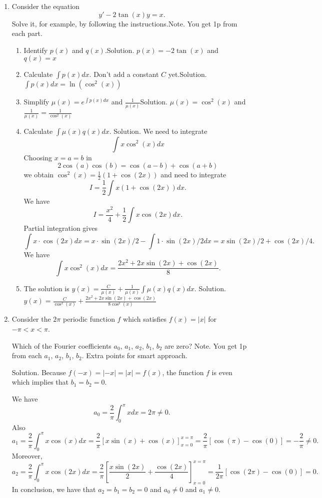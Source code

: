 \documentclass[12pt]{article}
\newcommand{\sqbrac}[1]{\left[#1\right]}
\newcommand{\ratkaisu}[1]{{\color{blue}\quad\textrm{Solution. } #1}}
\newcommand{\huomautus}[1]{{\color{magenta}\quad\textrm{Note. } #1}}
\begin{document}
\begin{enumerate}
\begin{enumerate}
\huomautus{The problem is graded as whole. Depending on the explanation / Points are given with the idea $1.6+1.6+1.6$ and then rounded up.}

\end{enumerate}

\item Consider the equation
$$
y'-2\tan(x)y=x.
$$
Solve it, for example, by following the instructions.\huomautus{You get 1p from each part.}
\begin{enumerate}
\item Identify $p(x)$ and $q(x)$.\ratkaisu{$p(x)=-2\tan(x)$ and $q(x)=x$}
\item Calculate $\int p(x)dx$. Don't add a constant $C$ yet.\ratkaisu{$\int p(x)dx=\ln(\cos^2(x))$}
\item Simplify $\mu(x)=e^{\int p(x)dx}$ and $\frac{1}{\mu(x)}$\ratkaisu{$\mu(x)=\cos^2(x)$ and $\frac{1}{\mu(x)}=\frac{1}{\cos^2(x)}$}
\item Calculate $\int \mu(x)q(x)dx$.
\ratkaisu{We need to integrate
$$
\int x\cos^2(x)dx
$$
Choosing $x=a=b$ in
$$
2\cos(a)\cos(b)=\cos(a-b)+\cos(a+b)
$$
we obtain $\cos^2(x)=\frac12(1+\cos(2x))$ and need to integrate
$$
I=\frac12\int x(1+\cos(2x))dx.
$$
We have
$$
I=\frac{x^2}{4}+\frac12\int x\cos(2x)dx.
$$
Partial integration gives
$$
\int x\cdot \cos(2x)dx
=x\cdot \sin(2x)/2-\int 1\cdot \sin(2x)/2 dx
=x\sin(2x)/2+\cos(2x)/4.
$$
We have
$$
\int x\cos^2(x)dx
=\frac{2x^2+2x\sin(2x)+\cos(2x)}{8}.
$$
}
\item The solution is $y(x)=\frac{C}{\mu(x)}+\frac{1}{\mu(x)}\int \mu(x)q(x)dx$.
\ratkaisu{$y(x)=\frac{C}{\cos^2(x)}+\frac{2x^2+2x\sin(2x)+\cos(2x)}{8\cos^2(x)}$}
\end{enumerate}

\item Consider the $2\pi$ periodic function $f$ which satisfies $f(x)=|x|$ for $-\pi<x<\pi$.

Which of the Fourier coefficients $a_0$, $a_1$, $a_2$, $b_1$, $b_2$ are zero?
\huomautus{You get 1p from each $a_1$, $a_2$, $b_1$, $b_2$. Extra points for smart approach.}


\ratkaisu{Because $f(-x)=|-x|=|x|=f(x)$, the function $f$ is even which implies that $b_1=b_2=0$.

We have
$$
a_0=\frac{2}{\pi}\int_0^\pi xdx
=2\pi\neq 0.
$$
Also
$$
a_1=\frac{2}{\pi}\int_0^\pi x\cos(x)dx
=\frac{2}{\pi}\sqbrac{x\sin(x)+\cos(x)}_{x=0}^{x=\pi}
=\frac{2}{\pi}[\cos(\pi)-\cos(0)]
=-\frac{2}{\pi}\neq 0.
$$
Moreover,
$$
a_2=\frac{2}{\pi}\int_0^\pi x\cos(2x)dx
=\frac{2}{\pi}\sqbrac{\frac{x\sin(2x)}{2}+\frac{\cos(2x)}{4}}_{x=0}^{x=\pi}
=\frac{1}{2\pi}[\cos(2\pi)-\cos(0)]=0.
$$
In conclusion, we have that $a_2=b_1=b_2=0$ and $a_0\neq 0$ and $a_1\neq 0$.}

\end{enumerate}
\end{document}

